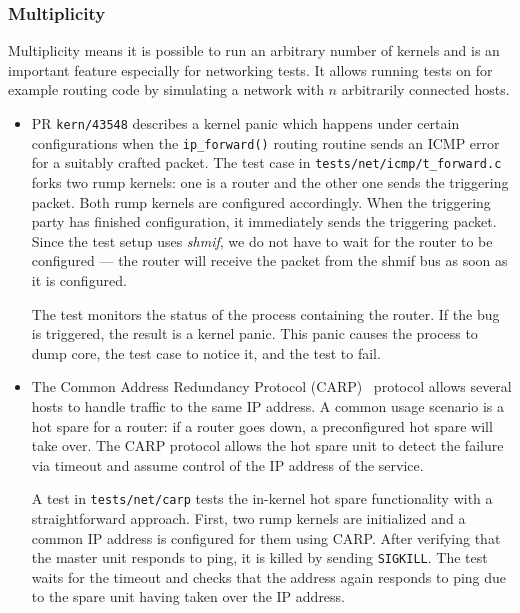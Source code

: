 \subsubsection*{Multiplicity}

Multiplicity means it is possible to run an arbitrary number of
kernels and is an important feature especially for networking
tests.  It allows running tests on for example routing code by
simulating a network with $n$ arbitrarily connected hosts.

\begin{itemize}
\item   PR \texttt{kern/43548} describes a kernel panic which
	happens under certain configurations when the
	\verb+ip_forward()+ routing routine sends an ICMP error
	for a suitably crafted packet.  The test case in
	\verb+tests/net/icmp/t_forward.c+ forks two rump kernels:
	one is a router and the other one sends the triggering
	packet.  Both rump kernels are configured accordingly.
	When the triggering party has finished configuration, it
	immediately sends the triggering packet.  Since the test
	setup uses \textit{shmif}, we do not have to wait for the
	router to be configured --- the router will receive the
	packet from the shmif bus as soon as it is configured.

	The test monitors the status of the process containing the
	router.  If the bug is triggered, the result is a kernel panic.
	This panic causes the process to dump core, the test case to
	notice it, and the test to fail.

\item   The Common Address Redundancy Protocol (CARP)~\cite{man4:carp}
	protocol allows several hosts to handle traffic to the same
	IP address.  A common usage scenario is a hot spare for a
	router: if a router goes down, a preconfigured hot spare
	will take over.  The CARP protocol allows the hot spare
	unit to detect the failure via timeout and assume control
	of the IP address of the service.

	A test in \verb+tests/net/carp+ tests the in-kernel hot
	spare functionality with a straightforward approach.  First,
	two rump kernels are initialized and a common IP address
	is configured for them using CARP.  After verifying that
	the master unit responds to ping, it is killed by sending
	\texttt{SIGKILL}.  The test waits for the timeout and checks
	that the address again responds to ping due to the spare
	unit having taken over the IP address.
\end{itemize}

